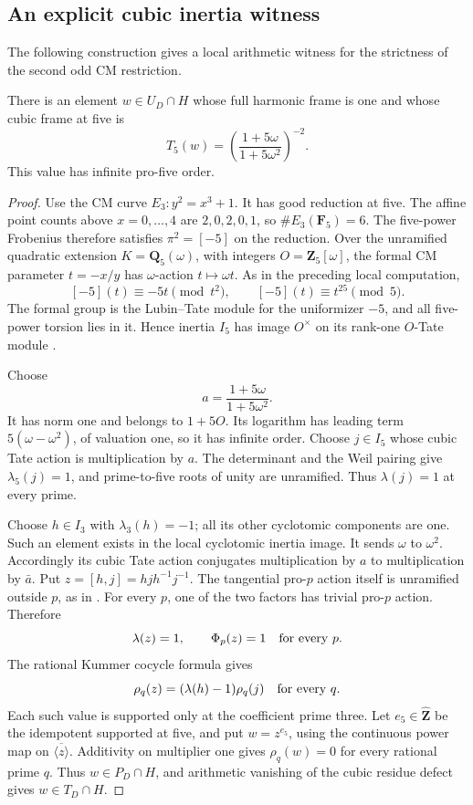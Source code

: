 \subsection{An explicit cubic inertia witness}

The following construction gives a local arithmetic witness for the
strictness of the second odd CM restriction.

\begin{proposition}\label{prop:five-inertia-odd-cubic}
There is an element \(w\in U_D\cap H\) whose full harmonic
frame is one and whose cubic frame at five is
\[
 T_5(w)=\left(\frac{1+5\omega}{1+5\omega^2}\right)^{-2}.
\]
This value has infinite pro-five order.
\end{proposition}
\begin{proof}
Use the CM curve \(E_3:y^2=x^3+1\).
It has good reduction at five.  The affine point counts
above \(x=0,\ldots,4\) are \(2,0,2,0,1\), so
\(\#E_3(\mathbf F_5)=6\).  The five-power Frobenius
therefore satisfies \(\pi^2=[-5]\) on the reduction.
Over the unramified quadratic extension
\(K=\mathbf Q_5(\omega)\), with integers
\(O=\mathbf Z_5[\omega]\), the formal CM parameter
\(t=-x/y\) has \(\omega\)-action \(t\mapsto\omega t\).
As in the preceding local computation,
\[
 [-5](t)\equiv-5t\pmod{t^2},\qquad
 [-5](t)\equiv t^{25}\pmod5.
\]
The formal group is the Lubin--Tate module for the
uniformizer \(-5\), and all five-power torsion lies in
it.  Hence inertia \(I_5\) has image \(O^\times\) on
its rank-one \(O\)-Tate module
\cite[Theorem~2(b),(d),(e), pp.~383--384]{LubinTate1965}.

Choose
\[
                       a=\frac{1+5\omega}{1+5\omega^2}.
\]
It has norm one and belongs to \(1+5O\).  Its logarithm
has leading term \(5(\omega-\omega^2)\), of valuation
one, so it has infinite order.  Choose \(j\in I_5\)
whose cubic Tate action is multiplication by \(a\).
The determinant and the Weil pairing give
\(\lambda_5(j)=1\), and prime-to-five roots of unity
are unramified.  Thus \(\lambda(j)=1\) at every prime.

Choose \(h\in I_3\) with \(\lambda_3(h)=-1\);
all its other cyclotomic components are one.  Such an
element exists in the local cyclotomic inertia image.
It sends \(\omega\) to \(\omega^2\).  Accordingly its
cubic Tate action conjugates multiplication by \(a\)
to multiplication by \(\bar a\).
Put \(z=[h,j]=h j h^{-1}j^{-1}\).
The tangential pro-\(p\) action itself is unramified
outside \(p\), as in \cite[\S8.5]{HainMatsumoto2003}.
For every \(p\), one of the two factors has trivial
pro-\(p\) action.  Therefore
\[
                    \lambda(z)=1,\qquad \Phi_p(z)=1
                                      \quad\hbox{for every }p.
\]
The rational Kummer cocycle formula gives
\[
                \rho_q(z)=(\lambda(h)-1)\rho_q(j)
                                      \quad\hbox{for every }q.
\]
Each such value is supported only at the coefficient
prime three.  Let \(e_5\in\widehat{\mathbf Z}\)
be the idempotent supported at five, and put
\(w=z^{e_5}\), using the continuous power map on
\(\overline{\langle z\rangle}\).
Additivity on multiplier one gives \(\rho_q(w)=0\)
for every rational prime \(q\).  Thus
\(w\in P_D\cap H\), and arithmetic vanishing of the
cubic residue defect gives \(w\in T_D\cap H\).


\end{proof}

